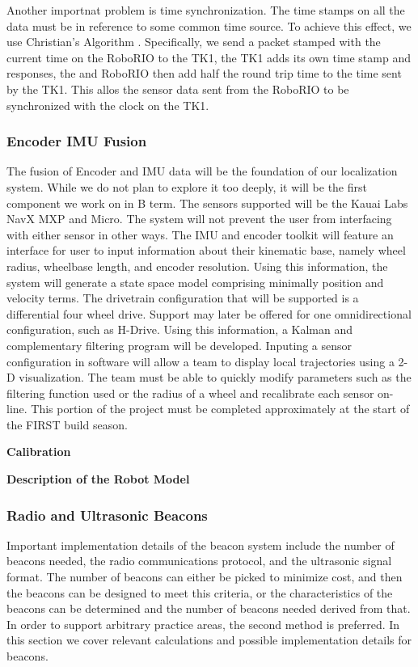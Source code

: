 \documentclass{article}
\begin{document}
      Another importnat problem is time synchronization. The time stamps on all the data must be in reference to some common time source. To achieve this effect, we use Christian's Algorithm \cite{cristian_probabilistic_1989}. Specifically, we send a packet stamped with the current time on the RoboRIO to the TK1, the TK1 adds its own time stamp and responses, the and RoboRIO then add half the round trip time to the time sent by the TK1. This allos the sensor data sent from the RoboRIO to be synchronized with the clock on the TK1.

    \subsubsection{Encoder IMU Fusion}

      The fusion of Encoder and IMU data will be the foundation of our localization system. While we do not plan to explore it too deeply, it will be the first component we work on in B term. The sensors supported will be the Kauai Labs NavX MXP and Micro. The system will not prevent the user from interfacing with either sensor in other ways. The IMU and encoder toolkit will feature an interface for user to input information about their kinematic base, namely wheel radius, wheelbase length, and encoder resolution. Using this information, the system will generate a state space model comprising minimally position and velocity terms. The drivetrain configuration that will be supported is a differential four wheel drive. Support may later be offered for one omnidirectional configuration, such as H-Drive. Using this information, a Kalman and complementary filtering program will be developed. Inputing a sensor configuration in software will allow a team to display local trajectories using a 2-D visualization. The team must be able to quickly modify parameters such as the filtering function used or the radius of a wheel and recalibrate each sensor on-line. This portion of the project must be completed approximately at the start of the FIRST build season.



      \textbf{Calibration}

      \textbf{Description of the Robot Model}


    \subsubsection{Radio and Ultrasonic Beacons}

      Important implementation details of the beacon system include the number of beacons needed, the radio communications protocol, and the ultrasonic signal format. The number of beacons can either be picked to minimize cost, and then the beacons can be designed to meet this criteria, or the characteristics of the beacons can be determined and the number of beacons needed derived from that. In order to support arbitrary practice areas, the second method is preferred. In this section we cover relevant calculations and possible implementation details for beacons.
\end{document}
